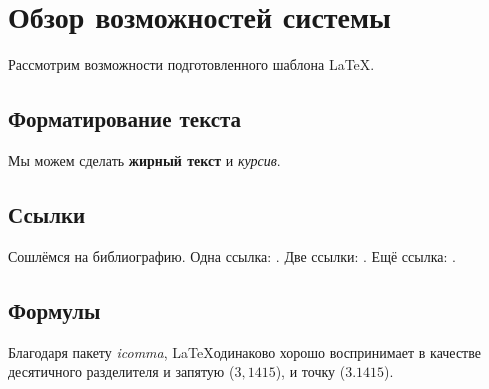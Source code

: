 %
%
%
%
%


\chapter{Обзор возможностей системы}
Рассмотрим возможности подготовленного шаблона \LaTeX.

\section{Форматирование текста}
Мы можем сделать \textbf{жирный текст} и \textit{курсив}.

\section{Ссылки}
Сошлёмся на библиографию.
Одна ссылка: \cite{juniper}.
Две ссылки: \cite{huawei1, aero_mission}.
Ещё ссылка: \cite{foresight}.

\section{Формулы}\label{sec:chapter_1/section_3}

Благодаря пакету \textit{icomma}, \LaTeX одинаково хорошо воспринимает в качестве десятичного разделителя и запятую (\(3,1415\)), и точку (\(3.1415\)).

